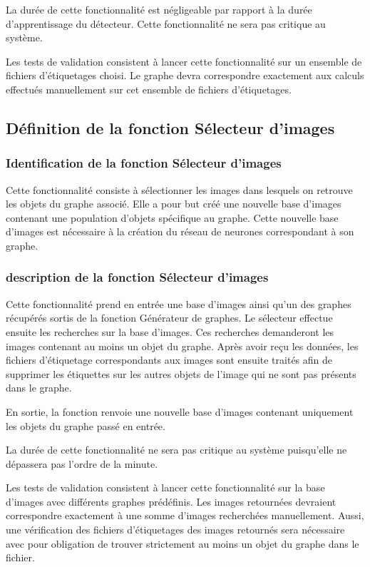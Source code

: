 \documentclass[debug,nodate,hideweeklyreports]{polytech/polytech}
\begin{document}
La durée de cette fonctionnalité est négligeable par rapport à la durée d'apprentissage du détecteur. Cette fonctionnalité ne sera pas critique au système.

Les tests de validation consistent à lancer cette fonctionnalité sur un ensemble de fichiers d'étiquetages choisi. Le graphe devra correspondre exactement aux calculs effectués manuellement sur cet ensemble de fichiers d'étiquetages.

\subsection{Définition de la fonction Sélecteur d’images}

\subsubsection{Identification de la fonction Sélecteur d’images}

Cette fonctionnalité consiste à sélectionner les images dans lesquels on retrouve les objets du graphe associé. Elle a pour but créé une nouvelle base d’images contenant une population d’objets spécifique au graphe. Cette nouvelle base d’images est nécessaire à la création du réseau de neurones correspondant à son graphe.

\subsubsection{description de la fonction Sélecteur d’images}

Cette fonctionnalité prend en entrée une base d’images ainsi qu’un des graphes récupérés sortis de la fonction Générateur de graphes.
Le sélecteur effectue ensuite les recherches sur la base d’images. Ces recherches demanderont les images contenant au moins un objet du graphe.
Après avoir reçu les données, les fichiers d’étiquetage correspondants aux images sont ensuite traités afin de supprimer les étiquettes sur les autres objets de l’image qui ne sont pas présents dans le graphe.

En sortie, la fonction renvoie une nouvelle base d’images contenant uniquement les objets du graphe passé en entrée.

La durée de cette fonctionnalité ne sera pas critique au système puisqu'elle ne dépassera pas l'ordre de la minute.

Les tests de validation consistent à lancer cette fonctionnalité sur la base d'images  avec différents graphes prédéfinis. Les images retournées devraient correspondre exactement à une somme d'images recherchées manuellement. Aussi, une vérification des fichiers d'étiquetages des images retournés sera nécessaire avec pour obligation de trouver strictement au moins un objet du graphe dans le fichier. 
\end{document}
